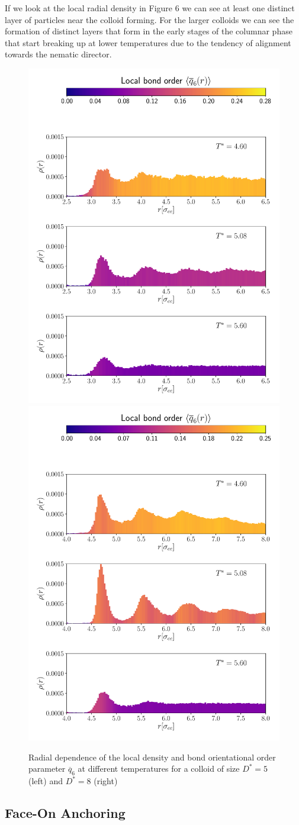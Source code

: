 If we look at the local radial density in Figure 6 we can see at least one distinct layer of particles near the colloid forming. For the larger colloids we can see the formation of distinct layers that form in the early stages of the columnar phase that start breaking up at lower temperatures due to the tendency of alignment towards the nematic director.
\begin{figure}[H]
    \centering
	\includegraphics[width=0.49\linewidth]{plots/beo_C32_raddensD5.pdf}
	\includegraphics[width=0.49\linewidth]{plots/beo_C32_raddensD8.pdf}
	\caption{Radial dependence of the local density and bond orientational order parameter $ \overline{q}_6$ at different temperatures for a colloid of size $D^* =  5$ (left) and $D^* = 8$ (right)}
    \label{fig:beoc32nemloc}
\end{figure}


\subsection{Face-On Anchoring}


